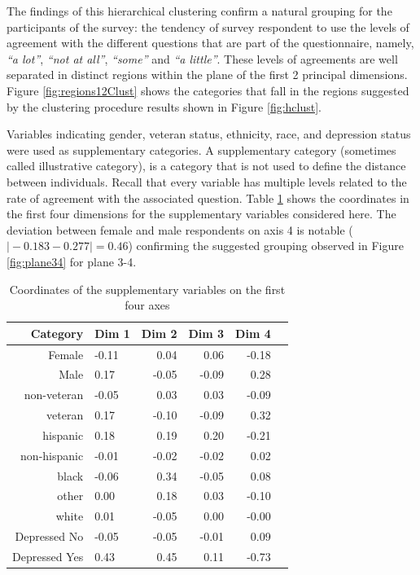 \documentclass[conference,final,]{IEEEtran}
\begin{document}
The findings of this hierarchical clustering confirm a natural grouping
for the participants of the survey: the tendency of survey respondent to
use the levels of agreement with the different questions that are part
of the questionnaire, namely, \emph{``a lot''}, \emph{``not at all''},
\emph{``some''} and \emph{``a little''}. These levels of agreements are
well separated in distinct regions within the plane of the first 2
principal dimensions. Figure \ref{fig:regions12Clust} shows the
categories that fall in the regions suggested by the clustering
procedure results shown in Figure \ref{fig:hclust}.

Variables indicating gender, veteran status, ethnicity, race, and
depression status were used as supplementary categories. A supplementary
category (sometimes called illustrative category), is a category that is
not used to define the distance between individuals. Recall that every
variable has multiple levels related to the rate of agreement with the
associated question. Table \ref{tab:supplCoord} shows the coordinates in
the first four dimensions for the supplementary variables considered
here. The deviation between female and male respondents on axis 4 is
notable (\(\vert -0.183 - 0.277 \vert = 0.46\)) confirming the suggested
grouping observed in Figure \ref{fig:plane34} for plane 3-4.

\begin{table}[ht]
\centering
\begin{tabular}{rlrrrr}
  \hline
  Category & Dim 1 & Dim 2 & Dim 3 & Dim 4 \\ 
  \hline
  \hline
  Female & -0.11 & 0.04 & 0.06 & -0.18 \\ 
  Male & 0.17 & -0.05 & -0.09 & 0.28 \\ 
  \hline
  non-veteran & -0.05 & 0.03 & 0.03 & -0.09 \\ 
  veteran & 0.17 & -0.10 & -0.09 & 0.32 \\ 
  \hline
  hispanic & 0.18 & 0.19 & 0.20 & -0.21 \\ 
  non-hispanic & -0.01 & -0.02 & -0.02 & 0.02 \\ 
  \hline
  black & -0.06 & 0.34 & -0.05 & 0.08 \\ 
  other & 0.00 & 0.18 & 0.03 & -0.10 \\ 
  white & 0.01 & -0.05 & 0.00 & -0.00 \\ 
  \hline
  Depressed No & -0.05 & -0.05 & -0.01 & 0.09 \\ 
  Depressed Yes & 0.43 & 0.45 & 0.11 & -0.73 \\ 
   \hline
\end{tabular}
\caption{Coordinates of the supplementary variables on the first four axes} 
\label{tab:supplCoord}
\end{table}
\end{document}
